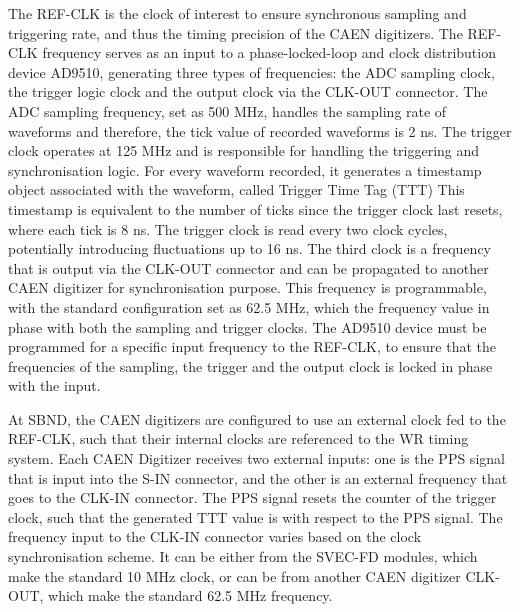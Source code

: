 The REF-CLK is the clock of interest to ensure synchronous sampling and triggering rate, and thus the timing precision of the CAEN digitizers.
The REF-CLK frequency serves as an input to a phase-locked-loop and clock distribution device AD9510, generating three types of frequencies: the ADC sampling clock, the trigger logic clock and the output clock via the CLK-OUT connector.
The ADC sampling frequency, set as 500 MHz, handles the sampling rate of waveforms and therefore, the tick value of recorded waveforms is 2 ns. 
The trigger clock operates at 125 MHz and is responsible for handling the triggering and synchronisation logic.
For every waveform recorded, it generates a timestamp object associated with the waveform, called Trigger Time Tag (TTT)
This timestamp is equivalent to the number of ticks since the trigger clock last resets, where each tick is 8 ns.
The trigger clock is read every two clock cycles, potentially introducing fluctuations up to 16 ns.
The third clock is a frequency that is output via the CLK-OUT connector and can be propagated to another CAEN digitizer for synchronisation purpose.
This frequency is programmable, with the standard configuration set as 62.5 MHz, which the frequency value in phase with both the sampling and trigger clocks.
The AD9510 device must be programmed for a specific input frequency to the REF-CLK, to ensure that the frequencies of the sampling, the trigger and the output clock is locked in phase with the input.

At SBND, the CAEN digitizers are configured to use an external clock fed to the REF-CLK, such that their internal clocks are referenced to the WR timing system. 
Each CAEN Digitizer receives two external inputs: one is the PPS signal that is input into the S-IN connector, and the other is an external frequency that goes to the CLK-IN connector.
The PPS signal resets the counter of the trigger clock, such that the generated TTT value is with respect to the PPS signal.
The frequency input to the CLK-IN connector varies based on the clock synchronisation scheme. 
It can be either from the SVEC-FD modules, which make the standard 10 MHz clock, or can be from another CAEN digitizer CLK-OUT, which make the standard 62.5 MHz frequency.

